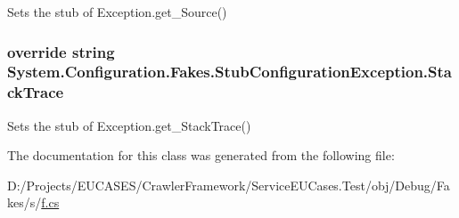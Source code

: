 Sets the stub of Exception.\-get\-\_\-\-Source()

\hypertarget{class_system_1_1_configuration_1_1_fakes_1_1_stub_configuration_exception_aaf923fc7d7acdc83dc0a39d6e14fc037}{
\subsubsection[{Stack\-Trace}]{\setlength{\rightskip}{0pt plus 5cm}override string System.\-Configuration.\-Fakes.\-Stub\-Configuration\-Exception.\-Stack\-Trace\hspace{0.3cm}{\ttfamily [get]}}}\label{class_system_1_1_configuration_1_1_fakes_1_1_stub_configuration_exception_aaf923fc7d7acdc83dc0a39d6e14fc037}


Sets the stub of Exception.\-get\-\_\-\-Stack\-Trace()



The documentation for this class was generated from the following file\-:\begin{DoxyCompactItemize}
\item 
D\-:/\-Projects/\-E\-U\-C\-A\-S\-E\-S/\-Crawler\-Framework/\-Service\-E\-U\-Cases.\-Test/obj/\-Debug/\-Fakes/s/\hyperlink{s_2f_8cs}{f.\-cs}\end{DoxyCompactItemize}
